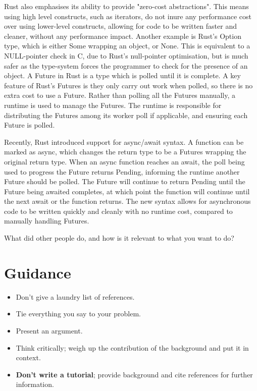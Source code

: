 \documentclass{l4proj}
\begin{document}
Rust also emphasises its ability to provide "zero-cost abstractions".
This means using high level constructs, such as iterators, do not inure any performance cost over using lower-level
constructs, allowing for code to be written faster and cleaner, without any performance impact.
Another example is Rust's Option type, which is either Some wrapping an object, or None.
This is equivalent to a NULL-pointer check in C, due to Rust's null-pointer optimisation, but is much safer as the
type-system forces the programmer to check for the presence of an object.
A Future in Rust is a type which is polled until it is complete.
A key feature of Rust's Futures is they only carry out work when polled, so there is no extra cost to use a Future.
Rather than polling all the Futures manually, a runtime is used to manage the Futures.
The runtime is responsible for distributing the Futures among its worker poll if applicable, and ensuring each Future is
polled.

Recently, Rust introduced support for async/await syntax.
A function can be marked as async, which changes the return type to be a Futures wrapping the original return type.
When an async function reaches an await, the poll being used to progress the Future returns Pending, informing the
runtime another Future should be polled.
The Future will continue to return Pending until the Future being awaited completes, at which point the function will
continue until the next await or the function returns.
The new syntax allows for asynchronous code to be written quickly and cleanly with no runtime cost, compared to manually
handling Futures.

What did other people do, and how is it relevant to what you want to do?
\section{Guidance}
\begin{itemize}    
    \item
      Don't give a laundry list of references.
    \item
      Tie everything you say to your problem.
    \item
      Present an argument.
    \item Think critically; weigh up the contribution of the background and put it in context.    
    \item
      \textbf{Don't write a tutorial}; provide background and cite
      references for further information.
\end{itemize}
\end{document}
